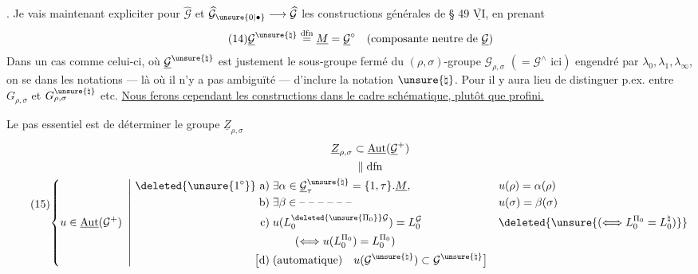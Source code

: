. Je vais maintenant expliciter pour $\widehat{\mathcal G}$ et $\widehat{\mathcal G}_{\unsure{0|\bullet}}\longrightarrow\widehat{\mathcal G}$ les constructions générales de § 49 $\overline{\underline{\mathrm{VI}}}$, en  prenant 
\[
\tag{14}
\underline{\mathcal G}^{\unsure{\natural}}\overset{\mathrm{dfn}}=
\underline M=\underline{\mathcal G}^{\circ}
\quad(\text{composante neutre de }\underline{\mathcal G})
\]
Dans un cas comme celui-ci, où $\underline{\mathcal G}^{\unsure{\natural}}$ est justement le sous-groupe fermé du $(\rho,\sigma)$-groupe $\mathcal G_{\rho,\sigma}$ $(=\mathcal G^{\wedge}\text{ ici})$ engendré par $\lambda_0,\lambda_1,\lambda_\infty$, on se  dans les notations --- là où il n'y a pas ambiguïté --- d'inclure la notation $\unsure{\natural}$. Pour  il y aura lieu de distinguer p.ex. entre $G_{\rho,\sigma}$ et $G_{\rho,\sigma}^{\unsure{\natural}}$ etc. \uline{Nous ferons cependant les constructions dans le cadre schématique, plutôt que profini.}


Le pas essentiel est de déterminer le groupe $\underline Z_{\rho,\sigma}$
\[
\tag{15}
\begin{gathered}
\underline Z_{\rho,\sigma}\subset\underline{\operatorname{Aut}}(\underline{\mathcal G}^{+})\\
\Vert\;\mathrm{dfn}\\
\left\{u\in\underline{\operatorname{Aut}}(\mathcal G^{+})\ \left|\
\begin{aligned}
\deleted{\unsure{1^{\circ}}}\ \text{a)}\;&\exists\alpha\in\underline{\mathcal G}_{\tau}^{\unsure{\natural}}=\{1,\tau\}.\underline M,
&&u(\rho)=\alpha(\rho)\\
\text{b)}\;&\exists\beta\in\text{-- -- -- -- -- --}
&&u(\sigma)=\beta(\sigma)\\
\text{c)}\;&u(L_0^{\deleted{\unsure{\Pi_0}}\mathcal G})=L_0^{\mathcal G}
&&\deleted{\unsure{(\Longleftrightarrow L_0^{\Pi_0}=L_0^{\natural})}}\\
&\qquad(\Longleftrightarrow u(L_0^{\Pi_0})=L_0^{\Pi_0})\\
\bigl[\text{d)}\;&(\text{automatique})\quad u(\mathcal G^{\unsure{\natural}})\subset\mathcal G^{\unsure{\natural}}\bigr]
\end{aligned}\right.\right.
\end{gathered}
\]

